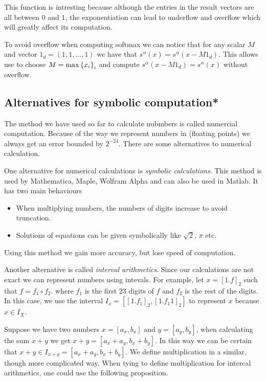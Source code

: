 \documentclass[11pt,a4paper]{article}
\begin{document}
This function is intresting because although the entries in the result vectors
are all between $0$ and $1$, the exponentiation can lead to underflow and
overflow which will greatly affect its computation.

To avoid overflow when computing softmax we can notice that for any scalar
$M$ and vector $1_d = (1, 1, \dots, 1)$ we have that 
$s^{\alpha}(x) = s^{\alpha}(x - M 1_d)$.
This allows use to choose $M = \max\set{x_i}_i$ and compute
$s^{\alpha}(x - M 1_d) = s^{\alpha}(x)$ without overflow.

\subsection{Alternatives for symbolic computation*}

The method we have used so far to calculate nubmbers is called numercial
computation.
Because of the way we represent numbers in (floating points) we always
get an error bounded by $2^{-24}$.
There are some alternatives to numerical calculation.

One alternative for numerical calculations is \emph{symbolic calculations}.
This method is used by Mathematica, Maple, Wolfram Alpha 
and can also be used in Matlab.
It has two main behaviours
\begin{itemize}
  \item When multiplying numbers, the numbers of digits increase to avoid
    truncation.
  \item Solutions of equations can be given symbolically like $\sqrt{2}$,
    $\pi$ etc.
\end{itemize}
Using this method we gain more accuracy, but lose speed of computation.

Another alternative is called \emph{interval arithmetics}.
Since our calculations are not exact we can represent numbers using intevals.
For example, let $x = [1.f]_2$ such that $f = f_1 \circ f_2$.
where $f_1$ is the first 23 digits of $f$ and $f_2$ is the rest of the digits.
In this case, we use the interval $I_x = [[1.f_1]_2,[1.f_1 1]_2]$ to represent
$x$ because $x \in I_X$.

Suppose we have two numbers $x = [a_x, b_x]$ and $y = [a_y, b_y]$, when
calculating the sum $x + y$ we get $x + y = [a_x + a_y, b_x + b_y]$.
In this way we can be certain that
$x + y \in I_{x+y} = [a_x + a_y, b_x + b_y]$.
We define multiplication in a similar, though more complicated way.
When tying to define multiplication for intercal arithmetics, one could
use the following proposition.
\end{document}
